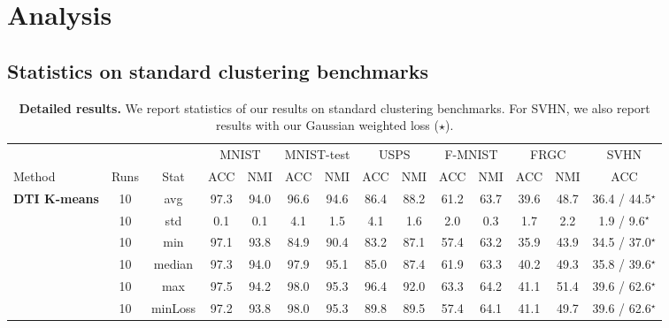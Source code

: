 \documentclass{article}
\begin{document}
\section{Analysis}\label{sec:analysis}

\subsection{Statistics on standard clustering benchmarks}\label{sec:statistics}
\vspace{-1.5em}
\begin{table}[!hb]
  \renewcommand{\arraystretch}{1}
  \addtolength{\tabcolsep}{-4pt}
  \caption{\textbf{Detailed results.} We report statistics of our results on standard 
  clustering benchmarks. For SVHN, we also report results with our Gaussian weighted loss 
($\star$).}
  \vspace{0.2em}
  \centering
  \scriptsize
  \begin{tabular}{@{}lccccccccccccc@{}} \toprule
  &  & & \multicolumn{2}{c}{MNIST} & \multicolumn{2}{c}{MNIST-test} &
  \multicolumn{2}{c}{USPS} & \multicolumn{2}{c}{F-MNIST} & \multicolumn{2}{c}{FRGC} & SVHN\\
  \cmidrule(lr){4-5}  \cmidrule(lr){6-7}  \cmidrule(lr){8-9} \cmidrule(lr){10-11} 
  \cmidrule(lr){12-13} \cmidrule(ll){14-14}
  Method & Runs & Stat & ACC & NMI & ACC & NMI & ACC & NMI & ACC & NMI & ACC & NMI & ACC\\
  \midrule

  \textbf{DTI K-means}
  & 10 & avg &  97.3 &  94.0 & 96.6  & 94.6 & 86.4 & 88.2 & 61.2 & 63.7 & 39.6 & 48.7 & 
  36.4 / 44.5$^{\star}$\\
  & 10 & std & 0.1 & 0.1 & 4.1 & 1.5 & 4.1 & 1.6 & 2.0 & 0.3 & 1.7 & 2.2 & 1.9 / 
  9.6$^{\star}$\\
  & 10 & min & 97.1 & 93.8 & 84.9 & 90.4 & 83.2 & 87.1 & 57.4 & 63.2 & 35.9 & 43.9 & 34.5 / 
  37.0$^{\star}$\\
  & 10 & median & 97.3 & 94.0 & 97.9 & 95.1 & 85.0 & 87.4 & 61.9 & 63.3 & 40.2 & 49.3 & 35.8 
  / 39.6$^{\star}$\\
  & 10 & max & 97.5 & 94.2 & 98.0 & 95.3 & 96.4 & 92.0 & 63.3 & 64.2 & 41.1 & 51.4 & 39.6 / 
  62.6$^{\star}$\\
  & 10 & minLoss & 97.2 & 93.8 & 98.0 & 95.3 & 89.8 & 89.5 & 57.4 & 64.1 & 41.1 & 49.7 & 39.6 
  / 62.6$^{\star}$\\


\end{tabular}
\end{table}
\end{document}
